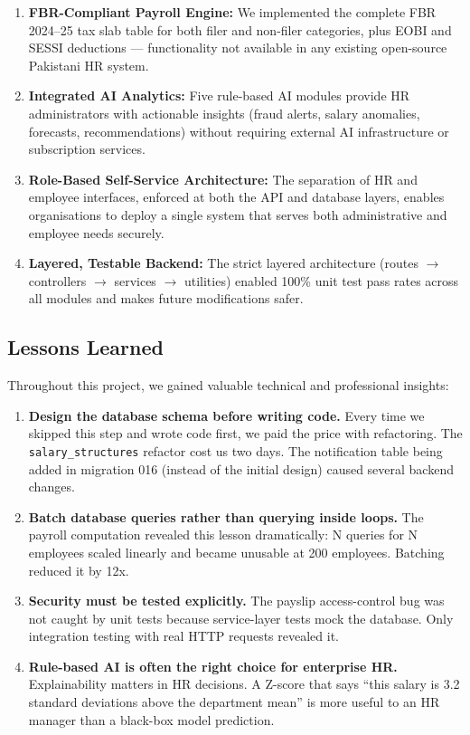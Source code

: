 \documentclass[12pt,a4paper]{report}
\begin{document}
\begin{enumerate}
    \item \textbf{FBR-Compliant Payroll Engine:} We implemented the complete FBR 2024--25 tax slab table for both filer and non-filer categories, plus EOBI and SESSI deductions --- functionality not available in any existing open-source Pakistani HR system.

    \item \textbf{Integrated AI Analytics:} Five rule-based AI modules provide HR administrators with actionable insights (fraud alerts, salary anomalies, forecasts, recommendations) without requiring external AI infrastructure or subscription services.

    \item \textbf{Role-Based Self-Service Architecture:} The separation of HR and employee interfaces, enforced at both the API and database layers, enables organisations to deploy a single system that serves both administrative and employee needs securely.

    \item \textbf{Layered, Testable Backend:} The strict layered architecture (routes $\to$ controllers $\to$ services $\to$ utilities) enabled 100\% unit test pass rates across all modules and makes future modifications safer.
\end{enumerate}

\subsection{Lessons Learned}

Throughout this project, we gained valuable technical and professional insights:

\begin{enumerate}
    \item \textbf{Design the database schema before writing code.} Every time we skipped this step and wrote code first, we paid the price with refactoring. The \texttt{salary\_structures} refactor cost us two days. The notification table being added in migration 016 (instead of the initial design) caused several backend changes.

    \item \textbf{Batch database queries rather than querying inside loops.} The payroll computation revealed this lesson dramatically: N queries for N employees scaled linearly and became unusable at 200 employees. Batching reduced it by 12x.

    \item \textbf{Security must be tested explicitly.} The payslip access-control bug was not caught by unit tests because service-layer tests mock the database. Only integration testing with real HTTP requests revealed it.

    \item \textbf{Rule-based AI is often the right choice for enterprise HR.} Explainability matters in HR decisions. A Z-score that says ``this salary is 3.2 standard deviations above the department mean'' is more useful to an HR manager than a black-box model prediction.
\end{enumerate}
\end{document}

